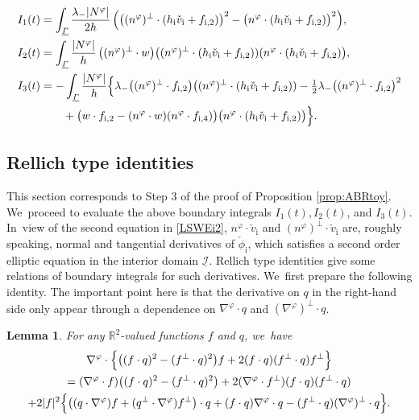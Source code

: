 \documentclass[10pt]{amsart}
\newcommand{\R}{{\mathbb R}}
\newcommand{\cI}{{\mathcal I}}
\newcommand{\ul}[1]{\underline{#1}}
\newcommand{\itGamma}{\mathit{\Gamma}}
\newtheorem{lemma}[theorem]{Lemma}
\theoremstyle{definition}
\begin{document}
\begin{align*}
I_1(t)
&= \int_{\ul{\itGamma}}\frac{\lambda_-|N^\varphi|}{2h}\,
\Bigl(\bigl((n^\varphi)^\perp\cdot(h_\mathrm{i}\check{v}_\mathrm{i}+f_{{\rm i},2}) \bigr)^2 - \bigl(n^\varphi\cdot(h_\mathrm{i}\check{v}_\mathrm{i}+f_{{\rm i},2}) \bigr)^2 \Bigr), \\
I_2(t)
&= \int_{\ul{\itGamma}}\frac{|N^\varphi|}{h}\,
\bigl((n^\varphi)^\perp\cdot w \bigr) \bigl((n^\varphi)^\perp\cdot(h_\mathrm{i}\check{v}_\mathrm{i}+f_{{\rm i},2}))(n^\varphi\cdot(h_\mathrm{i}\check{v}_\mathrm{i}+f_{{\rm i},2}) \bigr), \\
I_3(t)
&= -\int_{\ul{\itGamma}}\frac{|N^\varphi|}{h}\Bigl\{
\lambda_- \bigl((n^\varphi)^\perp\cdot f_{{\rm i},2} \bigr) \bigl((n^\varphi)^\perp\cdot(h_\mathrm{i}\check{v}_\mathrm{i}+f_{{\rm i},2}))
- \tfrac12\lambda_- \bigl((n^\varphi)^\perp\cdot f_{{\rm i},2} \bigr)^2 \\
&\qquad
+ \bigl(w\cdot f_{{\rm i},2} - (n^\varphi\cdot w)(n^\varphi\cdot f_{{\rm i},4}) \bigr) \bigl(n^\varphi\cdot(h_\mathrm{i}\check{v}_\mathrm{i}+f_{{\rm i},2}) \bigr) \Bigr\}.
\end{align*}

\subsection{Rellich type identities}
This section corresponds to Step 3 of the proof of Proposition \ref{prop:ABRtoy}. We~proceed to evaluate the above boundary integrals $I_1(t),I_2(t)$, and $I_3(t)$. In~view of the second equation in \eqref{LSWEi2}, $n^\varphi\cdot \check{v}_\mathrm{i}$ and $(n^\varphi)^\perp\cdot \check{v}_\mathrm{i}$ are, roughly speaking,
normal and tangential derivatives of $\check{\phi}_\mathrm{i}$, which satisfies a second order elliptic equation in the interior domain $\ul{\cI}$.
Rellich type identities give some relations of boundary integrals for such derivatives. We~first prepare the following identity.
The important point here is that the derivative on $q$ in the right-hand side only appear through a dependence on $\nabla^\varphi\cdot q$
and $(\nabla^\varphi)^\perp\cdot q$.

\begin{lemma}\label{lem:Rellich1}
For any $\R^2$-valued functions $f$ and $q$, we~have
\begin{multline*}
\nabla^\varphi\cdot\Bigl\{ \bigl((f\cdot q)^2-(f^\perp\cdot q)^2 \bigr)f + 2(f\cdot q)(f^\perp\cdot q)f^\perp \Bigr\} \\
= (\nabla^\varphi\cdot f)\bigl((f\cdot q)^2-(f^\perp\cdot q)^2 \bigr) + 2(\nabla^\varphi\cdot f^\perp)(f\cdot q)(f^\perp\cdot q) \\
+ 2|f|^2\Bigl\{ \bigl((q\cdot\nabla^\varphi)f + (q^\perp\cdot\nabla^\varphi)f^\perp \bigr)\cdot q
+ (f\cdot q)\nabla^\varphi\cdot q - (f^\perp\cdot q)(\nabla^\varphi)^\perp\cdot q \Bigr\}.
\end{multline*}
\end{lemma}
\end{document}
